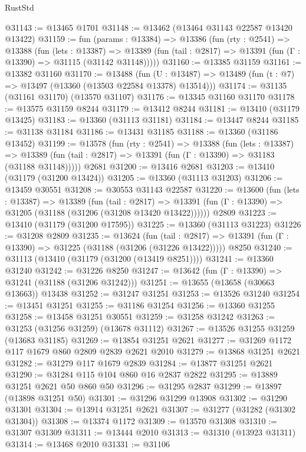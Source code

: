 \begin{lexlean}{RustStd}
\begin{coremodule}
@31143 := @13465 @1701
@31148 := @13462 (@13464 @31143 @22587 @13420 @13422)
@31159 := fun (params : @13384) =>
  @13386
    (fun (rty : @2541) =>
    @13388
      (fun (lets : @13387) =>
      @13389 (fun (tail : @2817) => @13391 (fun (Γ : @13390) => @31115 (@31142 @31148)))))
@31160 := @13385 @31159
@31161 := @13382 @31160
@31170 := @13488
    (fun (U : @13487) => @13489 (fun (t : @7) => @13497 (@13360 (@13503 @22584 @13378) @13514)))
@31174 := @31135 (@31161 @31170) (@13570 @31107)
@31176 := @13345 @31160 @31170
@31178 := @13575 @31159 @8244
@31179 := @13412 @8244
@31181 := @13410 (@31179 @13425)
@31183 := @13360 (@31113 @31181)
@31184 := @13447 @8244
@31185 := @31138 @31184
@31186 := @13431 @31185
@31188 := @13360 (@31186 @13452)
@31199 := @13578
    (fun (rty : @2541) =>
    @13388
      (fun (lets : @13387) =>
      @13389 (fun (tail : @2817) => @13391 (fun (Γ : @13390) => @31183 (@31188 @31148)))))
    @2681
@31200 := @13416 @2681
@31203 := @13410 (@31179 (@31200 @13424))
@31205 := @13360 (@31113 @31203)
@31206 := @13459 @30551
@31208 := @30553 @31143 @22587
@31220 := @13600
    (fun (lets : @13387) =>
    @13389
      (fun (tail : @2817) =>
      @13391 (fun (Γ : @13390) => @31205 (@31188 (@31206 (@31208 @13420 @13422))))))
    @2809
@31223 := @13410 (@31179 (@31200 @17595))
@31225 := @13360 (@31113 @31223)
@31226 := @31208 @2809
@31235 := @13624
    (fun (tail : @2817) => @13391 (fun (Γ : @13390) => @31225 (@31188 (@31206 (@31226 @13422)))))
    @8250
@31240 := @31113 (@13410 (@31179 (@31200 (@13419 @8251))))
@31241 := @13360 @31240
@31242 := @31226 @8250
@31247 := @13642 (fun (Γ : @13390) => @31241 (@31188 (@31206 @31242)))
@31251 := @13655 (@13658 (@30663 @13663)) @13438
@31252 := @31247 @31251
@31253 := @13526 @31240
@31254 := @13451 @31251
@31255 := @31186 @31254
@31256 := @13360 @31255
@31258 := @13458 @31251 @30551
@31259 := @31258 @31242
@31263 := @31253 (@31256 @31259) (@13678 @31112)
@31267 := @13526 @31255 @31259 (@13683 @31185)
@31269 := @13854 @31251 @2621
@31277 := @31269 @1172 @117 @1679 @860 @2809 @2839 @2621 @2010
@31279 := @13868 @31251 @2621
@31282 := @31279 @117 @1679 @2839
@31284 := @13877 @31251 @2621
@31290 := @31284 @115 @104 @860 @16 @2837 @2822
@31295 := @13889 @31251 @2621 @50 @860 @50
@31296 := @31295 @2837
@31299 := @13897 (@13898 @31251 @50)
@31301 := @31296 @31299 @13908
@31302 := @31290 @31301
@31304 := @13914 @31251 @2621
@31307 := @31277 (@31282 (@31302 @31304))
@31308 := @13374 @1172
@31309 := @13570 @31308
@31310 := @31307 @31309
@31311 := @13444 @2010
@31313 := @31310 (@13923 @31311)
@31314 := @13468 @2010
@31331 := @31106

\end{coremodule}
\end{lexlean}
